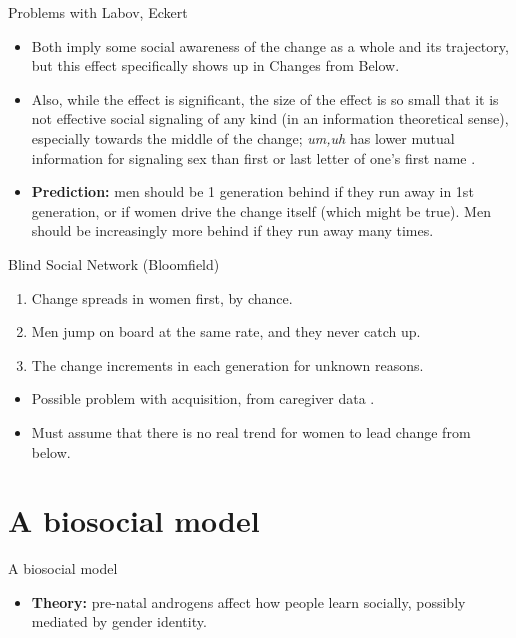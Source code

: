\documentclass[hyperref={pdfpagelabels=false}]{beamer}
\begin{document}
\begin{frame}{Problems with Labov, Eckert}
	\begin{itemize}
	\item Both imply some social awareness of the change as a whole and its trajectory, but this effect specifically shows up in Changes from Below.
	\item Also, while the effect is significant, the size of the effect is so small that it is not effective social signaling of any kind (in an information theoretical sense), especially towards the middle of the change; \textsl{um,uh} has lower mutual information for signaling sex than first or last letter of one's first name \citep{fruehwald2015}.
	\item \textbf{Prediction:} men should be 1 generation behind if they run away in 1st generation, or if women drive the change itself (which might be true). Men should be increasingly more behind if they run away many times.
	\end{itemize}
\end{frame}


\begin{frame}{Blind Social Network (Bloomfield)}
	\begin{enumerate}
	\item Change spreads in women first, by chance.
	\item Men jump on board at the same rate, and they never catch up.
	\item The change increments in each generation for unknown reasons.
	\end{enumerate}
	\begin{itemize}
	\item Possible problem with acquisition, from caregiver data \citep{smithetal2007}.
	\item Must assume that there is no real trend for women to lead change from below.
	\end{itemize}
\end{frame}




\section{A biosocial model}

\begin{frame}{A biosocial model}
	\begin{itemize}
	\item[ ] \textbf{Theory:} pre-natal androgens affect how people learn socially, possibly mediated by gender identity.
	\end{itemize}

\end{frame}
\end{document}
